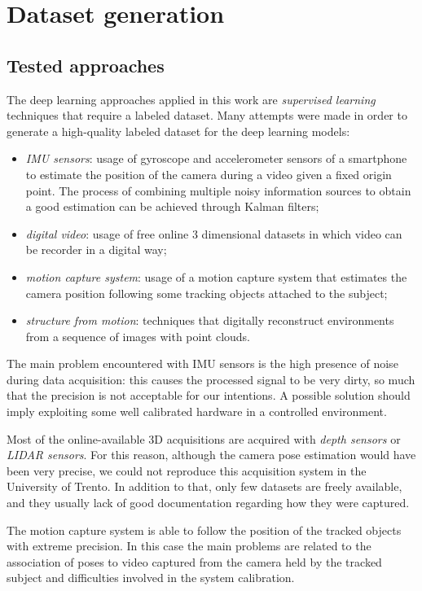 \section{Dataset generation}
\subsection{Tested approaches}
The deep learning approaches applied in this work are \emph{supervised learning} techniques that require a labeled dataset. Many attempts were made in order to generate a high-quality labeled dataset for the deep learning models:
\begin{itemize}
    \item \emph{IMU sensors}: usage of gyroscope and accelerometer sensors of a smartphone to estimate the position of the camera during a video given a fixed origin point. The process of combining multiple noisy information sources to obtain a good estimation can be achieved through Kalman filters;
    \item \emph{digital video}: usage of free online 3 dimensional datasets in which video can be recorder in a digital way;
    \item \emph{motion capture system}: usage of a motion capture system that estimates the camera position following some tracking objects attached to the subject;
    \item \emph{structure from motion}: techniques that digitally reconstruct environments from a sequence of images with point clouds.
\end{itemize}

The main problem encountered with IMU sensors is the high presence of noise during data acquisition: this causes the processed signal to be very dirty, so much that the precision is not acceptable for our intentions. A possible solution should imply exploiting some well calibrated hardware in a controlled environment.

Most of the online-available 3D acquisitions are acquired with \emph{depth sensors} or \emph{LIDAR sensors}. For this reason, although the camera pose estimation would have been very precise, we could not reproduce this acquisition system in the University of Trento. In addition to that, only few datasets are freely available, and they usually lack of good documentation regarding how they were captured.

The motion capture system is able to follow the position of the tracked objects with extreme precision. In this case the main problems are related to the association of poses to video captured from the camera held by the tracked subject and difficulties involved in the system calibration.

